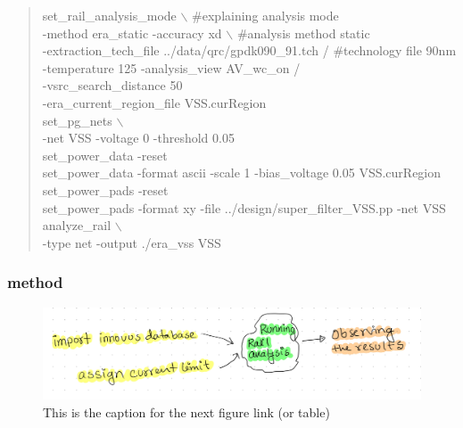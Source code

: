 \documentclass[a4paper]{article}
\begin{document}
\begin{verse}
\vspace*{1em}
set\_rail\_analysis\_mode $\backslash$                                \#explaining analysis mode\\
\hspace*{3em}-method era\_static -accuracy xd $\backslash$                    \#analysis method static\\
\hspace*{3em}-extraction\_tech\_file ../data/qrc/gpdk090\_91.tch /   \#technology file 90nm\\
\hspace*{3em}-temperature 125 -analysis\_view AV\_wc\_on /\\
\hspace*{3em}-vsrc\_search\_distance 50\\
\hspace*{3em}-era\_current\_region\_file VSS.curRegion\\
set\_pg\_nets $\backslash$\\
\vspace*{1em}
\hspace*{4em}-net VSS -voltage 0 -threshold 0.05\\
\vspace*{1em}
\vspace*{1em}
set\_power\_data -reset\\
set\_power\_data -format ascii -scale 1 -bias\_voltage 0.05 VSS.curRegion\\
\vspace*{1em}
set\_power\_pads -reset\\
set\_power\_pads -format xy -file ../design/super\_filter\_VSS.pp -net VSS\\
\vspace*{1em}
analyze\_rail $\backslash$\\
\hspace*{3em}-type net -output ./era\_vss VSS\\
\vspace*{1em}
\end{verse}


\subsubsection{method}
\label{sec:org381e4d7}
\begin{figure}[htbp]
\centering
\includegraphics[width=.9\linewidth]{./img/era1.JPG}
\caption{\label{fig:org07ec07c}This is the caption for the next figure link (or table)}
\end{figure}
\end{document}
